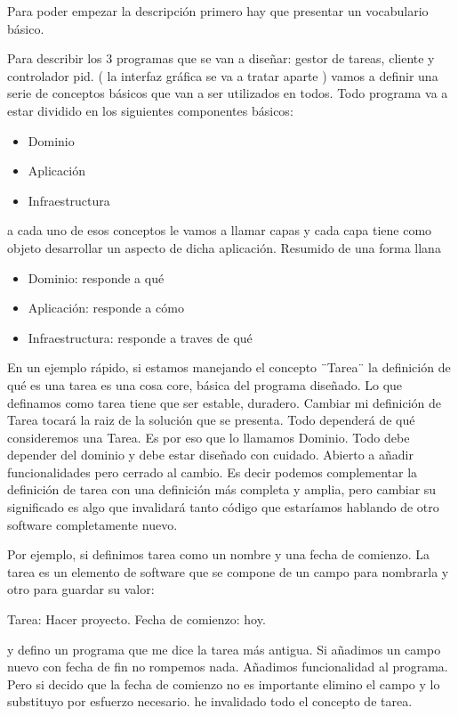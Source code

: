 
Para poder empezar la descripción primero hay que presentar un vocabulario básico.

Para describir los 3 programas que se van a diseñar: gestor de tareas, cliente y controlador pid. ( la interfaz gráfica se va a tratar aparte ) vamos a definir una serie de conceptos básicos que van a ser utilizados en todos. Todo programa va a estar dividido en los siguientes componentes básicos:

\begin{itemize}
    \item Dominio
    \item Aplicación
    \item Infraestructura
\end{itemize}

a cada uno de esos conceptos le vamos a llamar capas y cada capa tiene como objeto desarrollar un aspecto de dicha aplicación. Resumido de una forma llana

\begin{itemize}
    \item Dominio: responde a qué
    \item Aplicación: responde a cómo
    \item Infraestructura: responde a traves de qué
\end{itemize}

En un ejemplo rápido, si estamos manejando el concepto ¨Tarea¨ la definición de qué es una tarea es una cosa core, básica del programa diseñado. Lo que definamos como tarea tiene que ser estable, duradero. Cambiar mi definición de Tarea tocará la raiz de la solución que se presenta. Todo dependerá de qué consideremos una Tarea. Es por eso que lo llamamos Dominio. Todo debe depender del dominio y debe estar diseñado con cuidado. Abierto a añadir funcionalidades pero cerrado al cambio. Es decir podemos complementar la definición de tarea con una definición más completa y amplia, pero cambiar su significado es algo que invalidará tanto código que estaríamos hablando de otro software completamente nuevo.

Por ejemplo, si definimos tarea como un nombre y una fecha de comienzo. La tarea es un elemento de software que se compone de un campo para nombrarla y otro para guardar su valor:

Tarea: Hacer proyecto.
Fecha de comienzo: hoy.

y defino un programa que me dice la tarea más antigua. Si añadimos un campo nuevo con fecha de fin no rompemos nada. Añadimos funcionalidad al programa. Pero si decido que la fecha de comienzo no es importante elimino el campo y lo substituyo por esfuerzo necesario. he invalidado todo el concepto de tarea.

